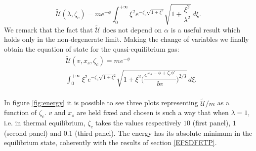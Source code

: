 \documentclass[useAMS,usenatbib,prd,twocolumn,nofootinbib]{revtex4-1}
\begin{document}
\begin{equation}
\tilde{\mathcal{U}}(\lambda,\zeta_c) = m e^{-\phi}  \int_0^{+\infty} \xi^2 e^{-\zeta_c \sqrt{1+\xi^2}} \sqrt{1+ \dfrac{\xi^2}{\lambda^2} } \, d\xi .
\end{equation}
We remark that the fact that $\tilde{\mathcal{U}}$ does not depend on $\alpha$ is a useful result which holds only in the non-degenerate limit.
Making the change of variables we finally obtain the equation of state for the quasi-equilibrium gas:
\begin{equation}\label{equazdistato}
\begin{split}
& \tilde{\mathcal{U}}(v,x_s,\zeta_c) =  me^{-\phi} \\
 & \int_0^{+\infty} \xi^2 e^{-\zeta_c \sqrt{1+\xi^2}} \sqrt{1+ \xi^2 \bigg( \dfrac{e^{x_s -\phi+ \zeta_c \phi'} }{bv} \bigg)^{2/3} } \, d\xi .\\
 \end{split} 
\end{equation}

In figure \ref{fig:energy} it is possible to see three plots representing $\tilde{\mathcal{U}}/m$ as a function of $\zeta_c$. $v$ and $x_s$ are held fixed and chosen is such a way that when $\lambda=1$, i.e. in thermal equilibrium, $\zeta_c$ takes the values respectively $10$ (first panel), $1$ (second panel) and $0.1$ (third panel). The energy has its absolute minimum in the equilibrium state, coherently with the results of section \ref{EFSDFETP}. 

\end{document}
